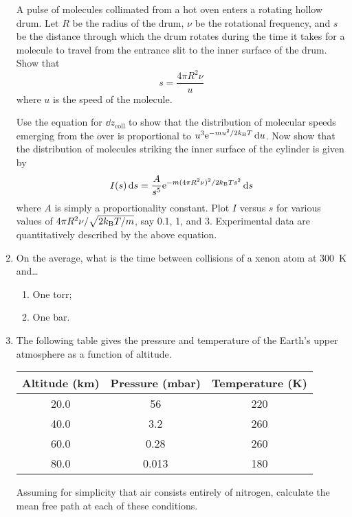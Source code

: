 \documentclass[../psets.tex]{subfiles}
\begin{document}
\begin{enumerate}[label={\textbf{27-\arabic*.}},leftmargin=3.5em]
\begin{figure}[H]
\begin{subfigure}[b]{0.3\linewidth}
            \caption{}
        \end{subfigure}
    \end{figure}
    A pulse of molecules collimated from a hot oven enters a rotating hollow drum. Let $R$ be the radius of the drum, $\nu$ be the rotational frequency, and $s$ be the distance through which the drum rotates during the time it takes for a molecule to travel from the entrance slit to the inner surface of the drum. Show that
    \begin{equation*}
        s = \frac{4\pi R^2\nu}{u}
    \end{equation*}
    where $u$ is the speed of the molecule.\par
    Use the equation for $\dd{z_\text{coll}}$ to show that the distribution of molecular speeds emerging from the over is proportional to $u^3\e[-mu^2/2\kB T]\dd{u}$. Now show that the distribution of molecules striking the inner surface of the cylinder is given by
    \begin{equation*}
        I(s)\dd{s} = \frac{A}{s^5}\e[-m(4\pi R^2\nu)^2/2\kB Ts^2]\dd{s}
    \end{equation*}
    where $A$ is simply a proportionality constant. Plot $I$ versus $s$ for various values of $4\pi R^2\nu/\sqrt{2\kB T/m}$, say 0.1, 1, and 3. Experimental data are quantitatively described by the above equation.
    \setcounter{enumi}{35}
    \item On the average, what is the time between collisions of a xenon atom at \SI{300}{\kelvin} and\dots
    \begin{enumerate}
        \item One torr;
        \item One bar.
    \end{enumerate}
    \setcounter{enumi}{39}
    \item The following table gives the pressure and temperature of the Earth's upper atmosphere as a function of altitude.
    \begin{center}
        \small
        \renewcommand{\arraystretch}{1.2}
        \begin{tabular}{ccc}
            Altitude (\si{\kilo\meter}) & Pressure (\si{\milli\bar}) & Temperature (\si{\kelvin})\\
            \hline
            20.0 & 56 & 220\\
            40.0 & 3.2 & 260\\
            60.0 & 0.28 & 260\\
            80.0 & 0.013 & 180\\
        \end{tabular}
    \end{center}
    Assuming for simplicity that air consists entirely of nitrogen, calculate the mean free path at each of these conditions.
\end{enumerate}
\end{document}
